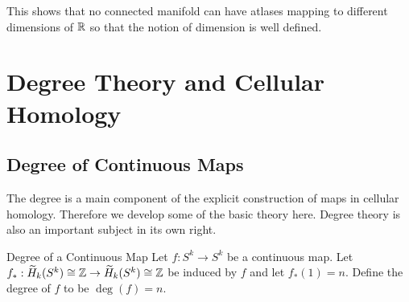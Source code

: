 \documentclass[a4paper]{article}
\begin{document}
This shows that no connected manifold can have atlases mapping to different dimensions of $\mathbb{R}$ so that the notion of dimension is well defined. 

\pagebreak
\section{Degree Theory and Cellular Homology}
\subsection{Degree of Continuous Maps}
The degree is a main component of the explicit construction of maps in cellular homology. Therefore we develop some of the basic theory here. Degree theory is also an important subject in its own right. 

\begin{defn}{Degree of a Continuous Map}{} Let $f:S^k\to S^k$ be a continuous map. Let $f_\ast:\widetilde{H}_k(S^k)\cong\mathbb{Z}\to\widetilde{H}_k(S^k)\cong\mathbb{Z}$ be induced by $f$ and let $f_\ast(1)=n$. Define the degree of $f$ to be $\deg(f)=n$. 
\end{defn}
\end{document}
